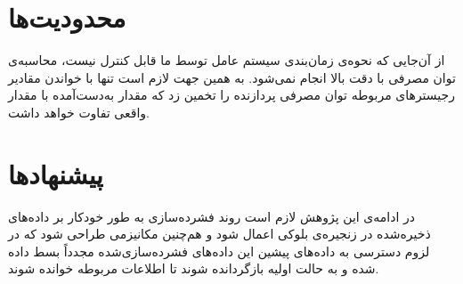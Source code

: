 \section{محدودیت‌ها}
از آن‌جایی که نحوه‌ی زمان‌بندی سیستم عامل توسط ما قابل کنترل نیست، محاسبه‌ی توان مصرفی با دقت بالا انجام نمی‌شود. به همین جهت لازم است تنها با خواندن مقادیر رجیسترهای مربوطه توان مصرفی پردازنده را تخمین زد که مقدار به‌دست‌آمده با مقدار واقعی تفاوت خواهد داشت.

\section{پیشنهادها}
در ادامه‌ی این پژوهش لازم است روند فشرده‌سازی به طور خودکار بر داده‌های ذخیره‌شده در زنجیره‌ی بلوکی اعمال شود و هم‌چنین مکانیزمی طراحی شود که در لزوم دسترسی به داده‌های پیشین این داده‌های فشرده‌سازی‌شده مجدداً بسط داده شده و به حالت اولیه بازگردانده شوند تا اطلاعات مربوطه خوانده شوند.